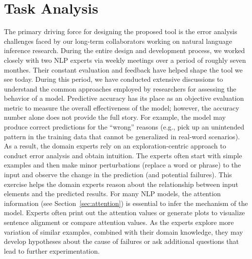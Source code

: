\section{Task Analysis}
\label{sec:task}
The primary driving force for designing the proposed tool is the error analysis challenges faced by our long-term collaborators working on natural language inference research. During the entire design and development process, we worked closely with two NLP experts via weekly meetings over a period of roughly seven monthes. Their constant evaluation and feedback have helped shape the tool we see today.
During this period, we have conducted extensive discussions to understand the common approaches employed by researchers for assessing the behavior of a model.
Predictive accuracy has its place as an objective evaluation metric to measure the overall effectiveness of the model; however, the accuracy number alone does not provide the full story.
For example, the model may produce correct predictions for the ``wrong'' reasons (e.g., pick up an unintended pattern in the training data that cannot be generalized in real-word scenarios).
%
As a result, the domain experts rely on an exploration-centric approach to conduct error analysis and obtain intuition.
The experts often start with simple examples and then make minor perturbations (replace a word or phrase) to the input and observe the change in the prediction (and potential failures). This exercise helps the domain experts reason about the relationship between input elements and the predicted results. 
For many NLP models, the attention information (see Section~\ref{sec:attention}) is essential to infer the mechanism of the model. Experts often print out the attention values or generate plots to visualize sentence alignment or compare attention values. As the experts explore more variation of similar examples, combined with their domain knowledge, they may develop hypotheses about the cause of failures or ask additional questions that lead to further experimentation.

